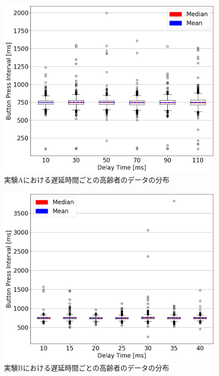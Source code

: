 \begin{figure}[tbp]
  \centering
  \includegraphics[scale=0.4]{figures/Honbann/BOXPLOT/BoxPlot_old_110ms.png}
  \caption{実験Aにおける遅延時間ごとの高齢者のデータの分布}
  \label{fig:110ms_Distribution_of_observations_by_old}
\end{figure}
\begin{figure}[tbp]
  \centering
  \includegraphics[scale=0.4]{figures/Honbann/BOXPLOT/BoxPlot_old_40ms.png}
  \caption{実験Bにおける遅延時間ごとの高齢者のデータの分布}
  \label{fig:40ms_Distribution_of_observations_by_old}
\end{figure}
\newpage

